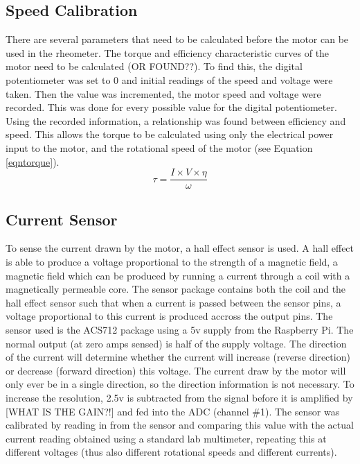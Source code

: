 \documentclass[twoside,a4]{report}
\def\br{\newline \newline \noindent}
\begin{document}
	
	
	\subsection{Speed Calibration} %
	There are several parameters that need to be calculated before the motor can be used in the rheometer. The torque and efficiency characteristic curves of the motor need to be calculated (OR FOUND??). To find this, the digital potentiometer was set to 0 and initial readings of the speed and voltage were taken. Then the value was incremented, the motor speed and voltage were recorded. This was done for every possible value for the digital potentiometer. Using the recorded information, a relationship was found between efficiency and speed. This allows the torque to be calculated using only the electrical power input to the motor, and the rotational speed of the motor (see Equation \ref{eqntorque}).
	\begin{equation}
	\tau = \frac{I \times V \times \eta}{\omega}
	\label{eqntorque}
	\end{equation}
	
	\subsection{Current Sensor}
	To sense the current drawn by the motor, a hall effect sensor is used. A hall effect is able to produce a voltage proportional to the strength of a magnetic field, a magnetic field which can be produced by running a current through a coil with a magnetically permeable core. The sensor package contains both the coil and the hall effect sensor such that when a current is passed between the sensor pins, a voltage proportional to this current is produced accross the output pins. The sensor used is the ACS712 package using a 5v supply from the Raspberry Pi. The normal output (at zero amps sensed) is half of the supply voltage. The direction of the current will determine whether the current will increase (reverse direction) or decrease (forward direction) this voltage. \br
	The current draw by the motor will only ever be in a single direction, so the direction information is not necessary. To increase the resolution, 2.5v is subtracted from the signal before it is amplified by [WHAT IS THE GAIN?!] and fed into the ADC (channel \#1). \br
	The sensor was calibrated by reading in from the sensor and comparing this value with the actual current reading obtained using a standard lab multimeter, repeating this at different voltages (thus also different rotational speeds and different currents). \br
	[RESULTS AND SUCH]
	
\end{document}
